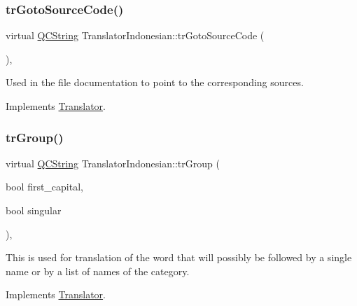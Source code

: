 \mbox{\label{class_translator_indonesian_a3587e2c864a997fce017669528004d54}} 
\subsubsection{\texorpdfstring{trGotoSourceCode()}{trGotoSourceCode()}}
{\footnotesize\ttfamily virtual \mbox{\hyperlink{class_q_c_string}{Q\+C\+String}} Translator\+Indonesian\+::tr\+Goto\+Source\+Code (\begin{DoxyParamCaption}{ }\end{DoxyParamCaption})\hspace{0.3cm}{\ttfamily [inline]}, {\ttfamily [virtual]}}

Used in the file documentation to point to the corresponding sources. 

Implements \mbox{\hyperlink{class_translator}{Translator}}.

\mbox{\label{class_translator_indonesian_a5a68b19dd94ff7338fdf36eeee7fecc6}} 
\subsubsection{\texorpdfstring{trGroup()}{trGroup()}}
{\footnotesize\ttfamily virtual \mbox{\hyperlink{class_q_c_string}{Q\+C\+String}} Translator\+Indonesian\+::tr\+Group (\begin{DoxyParamCaption}\item[{bool}]{first\+\_\+capital,  }\item[{bool}]{singular }\end{DoxyParamCaption})\hspace{0.3cm}{\ttfamily [inline]}, {\ttfamily [virtual]}}

This is used for translation of the word that will possibly be followed by a single name or by a list of names of the category. 

Implements \mbox{\hyperlink{class_translator}{Translator}}.

\mbox{\label{class_translator_indonesian_a8ad72b7a76b24eea82872a8d841165af}} 
